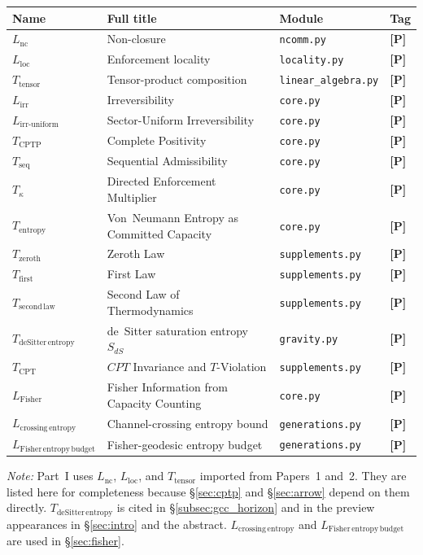 \documentclass[11pt]{article}
\newcommand{\epitag}[1]{\textbf{[#1]}}
\begin{document}
\medskip
\begin{tabular}{llll}
\toprule
Name & Full title & Module & Tag \\
\midrule
$L_{\mathrm{nc}}$ & Non-closure & \texttt{ncomm.py} & \epitag{P} \\
$L_{\mathrm{loc}}$ & Enforcement locality & \texttt{locality.py} & \epitag{P} \\
$T_{\mathrm{tensor}}$ & Tensor-product composition & \texttt{linear\_algebra.py} & \epitag{P} \\
$L_{\mathrm{irr}}$ & Irreversibility & \texttt{core.py} & \epitag{P} \\
$L_{\mathrm{irr\text{-}uniform}}$ & Sector-Uniform Irreversibility & \texttt{core.py} & \epitag{P} \\
$T_{\mathrm{CPTP}}$ & Complete Positivity & \texttt{core.py} & \epitag{P} \\
$T_{\mathrm{seq}}$ & Sequential Admissibility & \texttt{core.py} & \epitag{P} \\
$T_{\kappa}$ & Directed Enforcement Multiplier & \texttt{core.py} & \epitag{P} \\
$T_{\mathrm{entropy}}$ & Von~Neumann Entropy as Committed Capacity & \texttt{core.py} & \epitag{P} \\
$T_{\mathrm{zeroth}}$ & Zeroth Law & \texttt{supplements.py} & \epitag{P} \\
$T_{\mathrm{first}}$ & First Law & \texttt{supplements.py} & \epitag{P} \\
$T_{\mathrm{second\,law}}$ & Second Law of Thermodynamics & \texttt{supplements.py} & \epitag{P} \\
$T_{\mathrm{deSitter\,entropy}}$ & de~Sitter saturation entropy $S_{dS}$ & \texttt{gravity.py} & \epitag{P} \\
$T_{\mathrm{CPT}}$ & $CPT$ Invariance and $T$-Violation & \texttt{supplements.py} & \epitag{P} \\
$L_{\mathrm{Fisher}}$ & Fisher Information from Capacity Counting & \texttt{core.py} & \epitag{P} \\
$L_{\mathrm{crossing\,entropy}}$ & Channel-crossing entropy bound & \texttt{generations.py} & \epitag{P} \\
$L_{\mathrm{Fisher\,entropy\,budget}}$ & Fisher-geodesic entropy budget & \texttt{generations.py} & \epitag{P} \\
\bottomrule
\end{tabular}

\medskip
\noindent\textit{Note:} Part~I uses $L_{\mathrm{nc}}$, $L_{\mathrm{loc}}$,
and $T_{\mathrm{tensor}}$ imported from Papers~1 and~2.  They are listed
here for completeness because \S\ref{sec:cptp} and \S\ref{sec:arrow}
depend on them directly.  $T_{\mathrm{deSitter\,entropy}}$ is cited in
\S\ref{subsec:gcc_horizon} and in the preview appearances in \S\ref{sec:intro}
and the abstract.  $L_{\mathrm{crossing\,entropy}}$ and
$L_{\mathrm{Fisher\,entropy\,budget}}$ are used in \S\ref{sec:fisher}.
\end{document}
